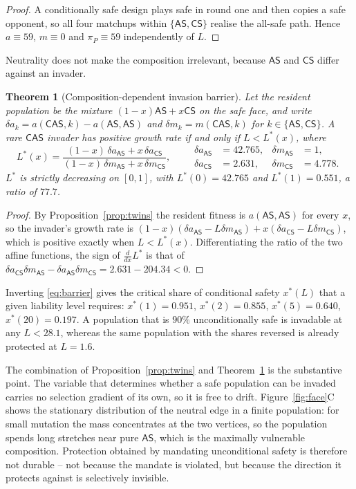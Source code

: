 \documentclass[11pt,a4paper]{article}
\newtheorem{theorem}{Theorem}
\theoremstyle{definition}
\newcommand{\AS}{\textsf{AS}}
\newcommand{\CS}{\textsf{CS}}
\newcommand{\CAS}{\textsf{CAS}}
\newcommand{\piP}{\pi_{P}}
\begin{document}
\begin{proof}
A conditionally safe design plays safe in round one and then copies a safe
opponent, so all four matchups within $\{\AS,\CS\}$ realise the all-safe path.
Hence $a\equiv 59$, $m\equiv 0$ and $\piP\equiv 59$ independently of $L$.
\end{proof}

Neutrality does not make the composition irrelevant, because $\AS$ and $\CS$
differ against an invader.

\begin{theorem}[Composition-dependent invasion barrier]\label{thm:barrier}
Let the resident population be the mixture $(1-x)\AS+x\CS$ on the safe face,
and write
$\delta a_{k}=a(\CAS,k)-a(\AS,\AS)$ and $\delta m_{k}=m(\CAS,k)$ for
$k\in\{\AS,\CS\}$. A rare $\CAS$ invader has positive growth rate if and only
if $L<L^{*}(x)$, where
\begin{equation}
L^{*}(x)=\frac{(1-x)\,\delta a_{\AS}+x\,\delta a_{\CS}}
               {(1-x)\,\delta m_{\AS}+x\,\delta m_{\CS}},
\qquad
\begin{aligned}
\delta a_{\AS}&=42.765, &\delta m_{\AS}&=1,\\
\delta a_{\CS}&=2.631, &\delta m_{\CS}&=4.778 .
\end{aligned}
\label{eq:barrier}
\end{equation}
$L^{*}$ is strictly decreasing on $[0,1]$, with $L^{*}(0)=42.765$ and
$L^{*}(1)=0.551$, a ratio of $77.7$.
\end{theorem}

\begin{proof}
By Proposition~\ref{prop:twins} the resident fitness is $a(\AS,\AS)$ for every
$x$, so the invader's growth rate is
$(1-x)(\delta a_{\AS}-L\delta m_{\AS})+x(\delta a_{\CS}-L\delta m_{\CS})$,
which is positive exactly when $L<L^{*}(x)$. Differentiating the ratio of the
two affine functions, the sign of $\frac{d}{dx}L^{*}$ is that of
$\delta a_{\CS}\delta m_{\AS}-\delta a_{\AS}\delta m_{\CS}=2.631-204.34<0$.
\end{proof}

Inverting \eqref{eq:barrier} gives the critical share of conditional safety
$x^{*}(L)$ that a given liability level requires: $x^{*}(1)=0.951$,
$x^{*}(2)=0.855$, $x^{*}(5)=0.640$, $x^{*}(20)=0.197$. A population that is
$90\%$ unconditionally safe is invadable at any $L<28.1$, whereas the same
population with the shares reversed is already protected at $L=1.6$.

The combination of Proposition~\ref{prop:twins} and
Theorem~\ref{thm:barrier} is the substantive point. The variable that
determines whether a safe population can be invaded carries no selection
gradient of its own, so it is free to drift. Figure~\ref{fig:face}C shows the
stationary distribution of the neutral edge in a finite population: for small
mutation the mass concentrates at the two vertices, so the population spends
long stretches near pure $\AS$, which is the maximally vulnerable composition.
Protection obtained by mandating unconditional safety is therefore not
durable -- not because the mandate is violated, but because the direction it
protects against is selectively invisible.
\end{document}
